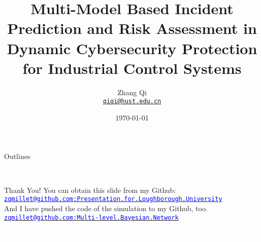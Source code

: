 \documentclass[10pt, trans]{beamer}
\title{Multi-Model Based Incident Prediction and Risk Assessment in Dynamic Cybersecurity Protection for Industrial Control Systems}
\subtitle{}
\date{\today}
\author[Zhang Qi] %
{
  Zhang Qi\\
  \href{mailto:qiqi@hust.edu.cn}{{\tt qiqi@hust.edu.cn}}
}
\institute{Automation School,\\Huazhong University of Science and Technology,\\Wuhan.}
\begin{document}
\maketitle

\begin{frame}[noframenumbering]{Outlines}\label{Outlines}
    \scriptsize
    \tableofcontents %
\end{frame}








\begin{frame}{}
    \label{Section: Thank You}
    \centering
    \vfill\vspace{1em}\textcolor{white}{\scshape Thank You!}\vfill
\end{frame}


\begin{frame}{Thank You!}
    \label{Thank You: Thank You}
    You can obtain this slide from my Github:\\
    \href{https://github.com/zqmillet/Presentation.for.Loughborough.University}{\tt \small \textcolor{blue}{zqmillet@github.com:Presentation.for.Loughborough.University}}\\[15pt]

    \pause
    And I have pushed the code of the simulation to my Github, too.\\
    \href{https://github.com/zqmillet/Multi-level.Bayesian.Network}{\tt \small \textcolor{blue}{zqmillet@github.com:Multi-level.Bayesian.Network}}\\[15pt]

\end{frame}

\begin{frame}{}
    \label{Section: Questions}
    \centering
    \vfill\vspace{1em}\textcolor{white}{\scshape Any Questions?}\vfill
\end{frame}
\end{document}
